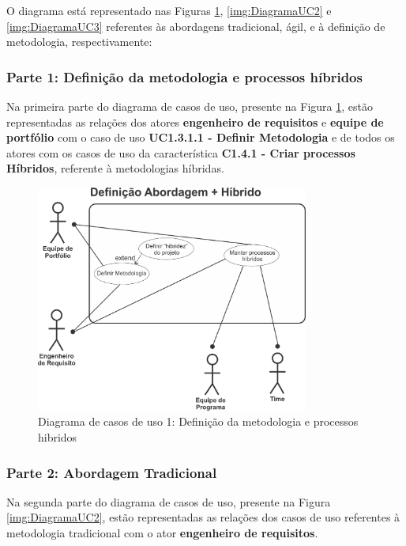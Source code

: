O diagrama está representado nas Figuras \ref{img:DiagramaUC1}, \ref{img:DiagramaUC2} e \ref{img:DiagramaUC3} referentes às abordagens tradicional, ágil, e à definição de metodologia, respectivamente:

\subsubsection{Parte 1: Definição da metodologia e processos híbridos}
	Na primeira parte do diagrama de casos de uso, presente na Figura \ref{img:DiagramaUC1}, estão representadas as relações dos atores \textbf{engenheiro de requisitos} e \textbf{equipe de portfólio} com o caso de uso \textbf{UC1.3.1.1 - Definir Metodologia} e de todos os atores com os casos de uso da característica \textbf{C1.4.1 - Criar processos Híbridos}, referente à metodologias híbridas.
	\\
\begin{figure}[H]
	\centering
	\includegraphics[width=0.8\textwidth]{imgModelagem/DiagramaUC1}
	\caption{Diagrama de casos de uso 1: Definição da metodologia e processos hibridos}
	\label{img:DiagramaUC1}
\end{figure}

\subsubsection{Parte 2: Abordagem Tradicional}

	Na segunda parte do diagrama de casos de uso, presente na Figura \ref{img:DiagramaUC2}, estão representadas as relações dos casos de uso referentes à metodologia tradicional com o ator \textbf{engenheiro de requisitos}.

